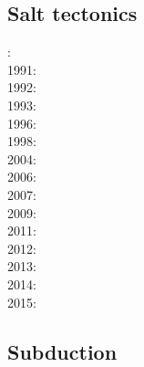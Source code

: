 \subsection*{Salt tectonics}

: \cite{woid78}\\
1991: \cite{tars91}\\
1992: \cite{zaju92}\\
1993: \cite{nabr93}\cite{vasv93}\\
1996: \cite{maar96}\\
1998: \cite{giju98}\\
2004: \cite{istt04}\cite{geim04}\\
2006: \cite{maqs07}\\
2007: \cite{huja07}\cite{maqs07}\\
2009: \cite{grba09}\\
2011: \cite{brfo11}\\
2012: \cite{fejr12}\\
2013: \cite{gobi13}\\
2014: \cite{bakp14}\cite{feka14a}\cite{feka14b}\cite{ghbu14}\\
2015: \cite{feka15}




\subsection*{Subduction}

